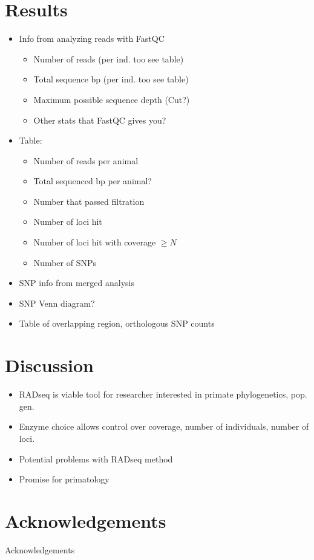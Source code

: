 \documentclass[12pt]{article}
\begin{document}

\section{Results}
\begin{itemize}
	\item Info from analyzing reads with FastQC
	\begin{itemize}
		\item Number of reads (per ind. too see table)
		\item Total sequence bp (per ind. too see table)
		\item Maximum possible sequence depth (Cut?)
		\item Other stats that FastQC gives you?
	\end{itemize}
	\item Table: 
	\begin{itemize}
		\item Number of reads per animal
		\item Total sequenced bp per animal?
		\item Number that passed filtration
		\item Number of loci hit
		\item Number of loci hit with coverage $\ge N$
		\item Number of SNPs
	\end{itemize}
	\item SNP info from merged analysis
	\item SNP Venn diagram?
	\item Table of overlapping region, orthologous SNP counts
\end{itemize}

\section{Discussion}
\begin{itemize}
	\item RADseq is viable tool for researcher interested in primate phylogenetics, pop. gen.
	\item Enzyme choice allows control over coverage, number of individuals, number of loci.
	\item Potential problems with RADseq method
	\item Promise for primatology
\end{itemize}

\section{Acknowledgements}
Acknowledgements
\end{document}
